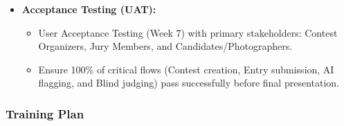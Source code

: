 \begin{itemize}[leftmargin=*, itemsep=0.5em]
    \begin{itemize}[label={-}, leftmargin=1.5em, itemsep=0.2em]
        \item Conducted in Week 7 on a Staging Environment hosted on AWS / Cloud VPS.
        \item Full regression testing of all modules (FE01 to FE07).
        \item Performance and Load Testing (using Apache JMeter or K6) for peak submission scenarios near contest deadlines and Hi-Res image viewing.
    \end{itemize}
    \item \textbf{Acceptance Testing (UAT):}
    \begin{itemize}[label={-}, leftmargin=1.5em, itemsep=0.2em]
        \item User Acceptance Testing (Week 7) with primary stakeholders: Contest Organizers, Jury Members, and Candidates/Photographers.
        \item Ensure 100\% of critical flows (Contest creation, Entry submission, AI flagging, and Blind judging) pass successfully before final presentation.
    \end{itemize}
\end{itemize}

\subsubsection{Training Plan}
\label{subsubsec:ii_training_plan}

